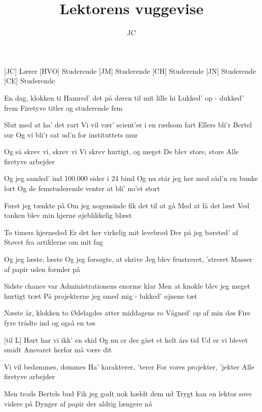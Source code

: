\documentclass[a4paper,11pt]{article}
\title{Lektorens vuggevise}
\author{JC}
\begin{document}
\maketitle

\begin{roles}
[JC] Lærer
[HVO] Studerende
[JM] Studerende
[CH] Studerende
[JN] Studerende
[CE] Studerende
\end{roles}

\begin{song}

 En dag, klokken ti
  Hamred' det på døren til mit lille hi
  Lukked' op - dukked' frem
  Firetyve titler og studerende fem


 Slut med at ha' det rart
  Vi vil vær' scient'er i en rædsom fart
  Ellers bli'r Bertel sur
  Og vi bli'r sat ud'n for instituttets mur


 Og så skrev vi, skrev vi
  Vi skrev hurtigt, og meget
  De blev store, store
  Alle firetyve arbejder

 Og jeg samled' ind
  100.000 sider i 24 bind
  Og nu står jeg her med såd'n en bunke lort
  Og de femstuderende venter at bli' no'et stort

 Først jeg tænkte på
  Om jeg nogensinde fik det til at gå
  Med at få det læst
  Ved tanken blev min hjerne øjeblikkelig blæst

 To timers hjernedød
  Er det her virkelig mit levebrød
  Der på jeg børsted' af
  Støvet fra artiklerne om mit fag

 Og jeg læste, læste
  Og jeg forsøgte, at skrive
  Jeg blev frustreret, 'streret
  Masser af papir uden formler på

 Sidste chance var
  Administrationens enorme klar
  Men at knokle blev jeg meget hurtigt træt
  På projekterne jeg smed mig - lukked' øjnene tæt

 Næste år, klokken to
  Ødelagdes atter middagens ro
  Vågned' op af min døs
  Fire fyre trådte ind og også en tøs

[til L] Hørt har vi ikk' en skid
  Og nu er der gået et helt års tid
  Ud er vi blevet smidt
  Ansvaret herfor må være dit 

 Vi vil bedømmes, dømmes
  Ha' karakterer, 'terer
  For vores projekter, 'jekter
  Alle firetyve arbejder

 Men trods Bertels bud
  Fik jeg godt nok hældt dem ud
  Trygt kan en lektor sove videre på
  Dynger af papir der aldrig længere nå

\end{song}
\end{document}
